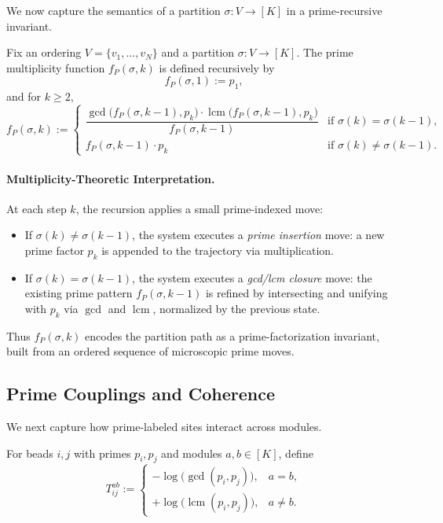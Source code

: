\documentclass[11pt]{article}
\begin{document}
We now capture the semantics of a partition $\sigma:V \to [K]$ in a prime-recursive invariant.

\begin{definition}
Fix an ordering $V = \{v_1,\dots,v_N\}$ and a partition $\sigma:V \to [K]$. The prime multiplicity function $f_P(\sigma,k)$ is defined recursively by
\[
  f_P(\sigma,1) := p_1,
\]
and for $k \ge 2$,
\[
  f_P(\sigma,k) :=
  \begin{cases}
    \displaystyle
    \dfrac{\gcd\big(f_P(\sigma,k-1),p_k\big)\cdot
           \operatorname{lcm}\big(f_P(\sigma,k-1),p_k\big)}
          {f_P(\sigma,k-1)}
      & \text{if } \sigma(k) = \sigma(k-1),\\[8pt]
    f_P(\sigma,k-1)\cdot p_k
      & \text{if } \sigma(k) \neq \sigma(k-1).
  \end{cases}
\]
\end{definition}

\paragraph{Multiplicity-Theoretic Interpretation.}

At each step $k$, the recursion applies a small prime-indexed move:

\begin{itemize}
  \item If $\sigma(k) \neq \sigma(k-1)$, the system executes a \emph{prime insertion} move: a new prime factor $p_k$ is appended to the trajectory via multiplication.
  \item If $\sigma(k) = \sigma(k-1)$, the system executes a \emph{gcd/lcm closure} move: the existing prime pattern $f_P(\sigma,k-1)$ is refined by intersecting and unifying with $p_k$ via $\gcd$ and $\operatorname{lcm}$, normalized by the previous state.
\end{itemize}

Thus $f_P(\sigma,k)$ encodes the partition path as a prime-factorization invariant, built from an ordered sequence of microscopic prime moves.

\subsection{Prime Couplings and Coherence}

We next capture how prime-labeled sites interact across modules.

\begin{definition}
For beads $i,j$ with primes $p_i,p_j$ and modules $a,b\in[K]$, define
\[
  T_{ij}^{ab} :=
  \begin{cases}
    -\log\big(\gcd(p_i,p_j)\big), & a = b,\\[4pt]
    +\log\big(\operatorname{lcm}(p_i,p_j)\big), & a \neq b.
  \end{cases}
\]
\end{definition}
\end{document}
